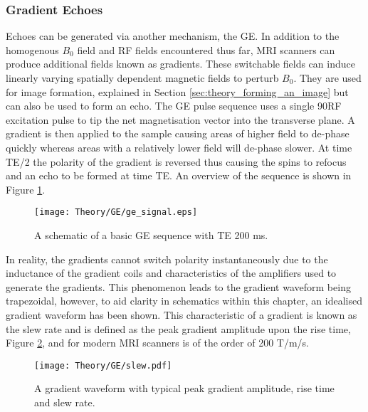 \subsubsection{Gradient Echoes}
\label{subsubsec:theory_ge}
Echoes can be generated via another mechanism, the \ac{GE}. In addition to the homogenous $B_0$ field and \ac{RF} fields encountered thus far, \ac{MRI} scanners can produce additional fields known as gradients. These switchable fields can induce linearly varying spatially dependent magnetic fields to perturb $B_0$. They are used for image formation, explained in Section \ref{sec:theory_forming_an_image} but can also be used to form an echo. The \ac{GE} pulse sequence uses a single 90\degree{ }\ac{RF} excitation pulse to tip the net magnetisation vector into the transverse plane. A gradient is then applied to the sample causing areas of higher field to de-phase quickly whereas areas with a relatively lower field will de-phase slower. At time \ac{TE}/2 the polarity of the gradient is reversed thus causing the spins to refocus and an echo to be formed at time \ac{TE}. An overview of the sequence is shown in Figure \ref{fig:theory_ge_signal}. 

\begin{figure}[H]
	\centering
	\texttt{[image: Theory/GE/ge\_signal.eps]}
	\caption{A schematic of a basic \acf{GE} sequence with \ac{TE} 200 ms.}
	\label{fig:theory_ge_signal}	
\end{figure}

In reality, the gradients cannot switch polarity instantaneously due to the inductance of the gradient coils and characteristics of the amplifiers used to generate the gradients. This phenomenon leads to the gradient waveform being trapezoidal, however, to aid clarity in schematics within this chapter, an idealised gradient waveform has been shown. This characteristic of a gradient is known as the slew rate and is defined as the peak gradient amplitude upon the rise time, Figure \ref{fig:theory_slew}, and for modern \ac{MRI} scanners is of the order of 200 T/m/s.

\begin{figure}[H]
	\centering
	\texttt{[image: Theory/GE/slew.pdf]}
	\caption{A gradient waveform with typical peak gradient amplitude, rise time and slew rate.}
	\label{fig:theory_slew}	
\end{figure}

